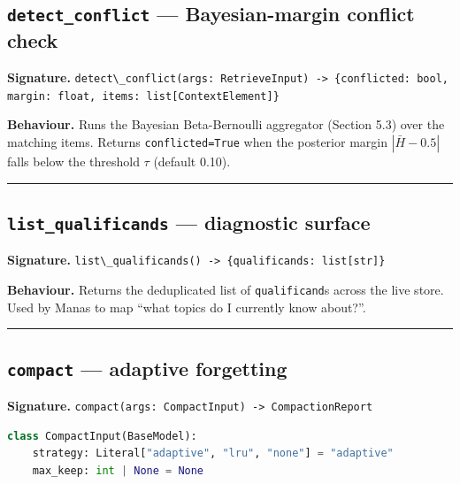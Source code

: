\subsection{\texorpdfstring{\texttt{detect\_conflict} --- Bayesian-margin conflict check}{detect\_conflict --- Bayesian-margin conflict check}}\label{detect_conflict-bayesian-margin-conflict-check}

\textbf{Signature.} \passthrough{\lstinline!detect\_conflict(args: RetrieveInput) -> \{conflicted: bool, margin: float, items: list[ContextElement]\}!}

\textbf{Behaviour.} Runs the Bayesian Beta-Bernoulli aggregator (Section 5.3) over the matching items. Returns \passthrough{\lstinline!conflicted=True!} when the posterior margin \(|\bar{H} - 0.5|\) falls below the threshold \(\tau\) (default 0.10).

\begin{center}\rule{0.5\linewidth}{0.5pt}\end{center}

\subsection{\texorpdfstring{\texttt{list\_qualificands} --- diagnostic surface}{list\_qualificands --- diagnostic surface}}\label{list_qualificands-diagnostic-surface}

\textbf{Signature.} \passthrough{\lstinline!list\_qualificands() -> \{qualificands: list[str]\}!}

\textbf{Behaviour.} Returns the deduplicated list of \passthrough{\lstinline!qualificand!}s across the live store. Used by Manas to map ``what topics do I currently know about?''.

\begin{center}\rule{0.5\linewidth}{0.5pt}\end{center}

\subsection{\texorpdfstring{\texttt{compact} --- adaptive forgetting}{compact --- adaptive forgetting}}\label{compact-adaptive-forgetting}

\textbf{Signature.} \passthrough{\lstinline!compact(args: CompactInput) -> CompactionReport!}

\begin{lstlisting}[language=Python]
class CompactInput(BaseModel):
    strategy: Literal["adaptive", "lru", "none"] = "adaptive"
    max_keep: int | None = None
\end{lstlisting}

